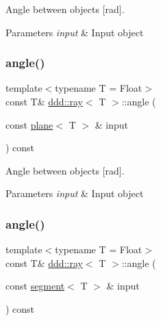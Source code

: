 Angle between objects \mbox{[}rad\mbox{]}. 


\begin{DoxyParams}{Parameters}
{\em input} & Input object \\
\hline
\end{DoxyParams}
\mbox{\label{classddd_1_1ray_ac7fa512fde0e202a0f64463b12ea7e11}} 
\subsubsection{\texorpdfstring{angle()}{angle()}\hspace{0.1cm}{\footnotesize\ttfamily [3/4]}}
{\footnotesize\ttfamily template$<$typename T = Float$>$ \\
const T\& \hyperlink{classddd_1_1ray}{ddd\+::ray}$<$ T $>$\+::angle (\begin{DoxyParamCaption}\item[{const \hyperlink{classddd_1_1plane}{plane}$<$ T $>$ \&}]{input }\end{DoxyParamCaption}) const\hspace{0.3cm}{\ttfamily [inline]}}



Angle between objects \mbox{[}rad\mbox{]}. 


\begin{DoxyParams}{Parameters}
{\em input} & Input object \\
\hline
\end{DoxyParams}
\mbox{\label{classddd_1_1ray_ab634fe1fa02504d0b5de85555be324d5}} 
\subsubsection{\texorpdfstring{angle()}{angle()}\hspace{0.1cm}{\footnotesize\ttfamily [4/4]}}
{\footnotesize\ttfamily template$<$typename T = Float$>$ \\
const T\& \hyperlink{classddd_1_1ray}{ddd\+::ray}$<$ T $>$\+::angle (\begin{DoxyParamCaption}\item[{const \hyperlink{classddd_1_1segment}{segment}$<$ T $>$ \&}]{input }\end{DoxyParamCaption}) const\hspace{0.3cm}{\ttfamily [inline]}}



